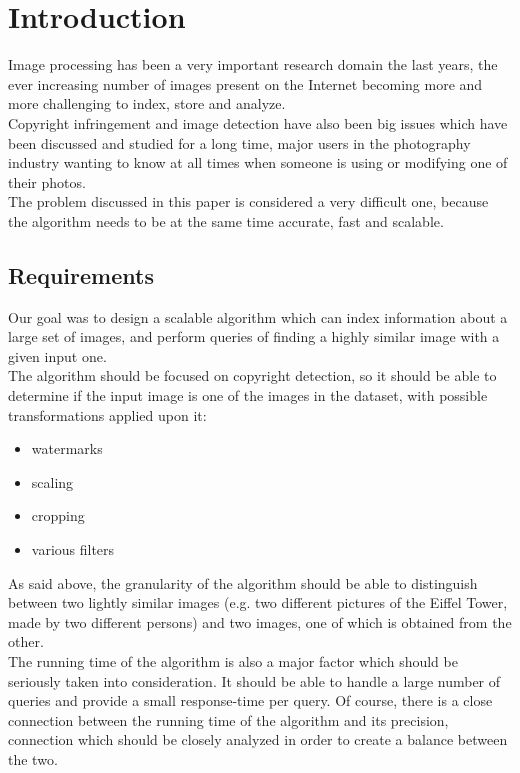 \chapter{Introduction}

Image processing has been a very important research domain the last years, the ever increasing number of images present on the Internet becoming more and more challenging to index, store and analyze.\\
Copyright infringement and image detection have also been big issues which have been discussed and studied for a long time, major users in the photography industry wanting to know at all times when someone is using or modifying one of their photos.\\
The problem discussed in this paper is considered a very difficult one, because the algorithm needs to be at the same time accurate, fast and scalable.\\

\section{Requirements}

Our goal was to design a scalable algorithm which can index information about a large set of images, and perform queries of finding a highly similar image with a given input one.\\
The algorithm should be focused on copyright detection, so it should be able to determine if the input image is one of the images in the dataset, with possible transformations applied upon it:
\begin{itemize}
	\item watermarks
	\item scaling
	\item cropping
	\item various filters
\end{itemize}

As said above, the granularity of the algorithm should be able to distinguish between two lightly similar images (e.g. two different pictures of the Eiffel Tower, made by two different persons) and two images, one of which is obtained from the other.\\

The running time of the algorithm is also a major factor which should be seriously taken into consideration. It should be able to handle a large number of queries and provide a small response-time per query. Of course, there is a close connection between the running time of the algorithm and its precision, connection which should be closely analyzed in order to create a balance between the two.

